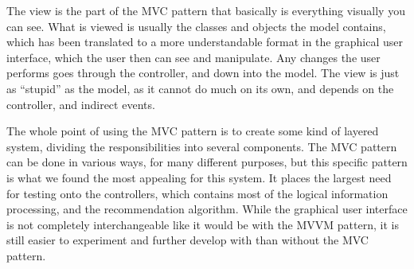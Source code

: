 The view is the part of the MVC pattern that basically is everything visually you can see. What is viewed is usually the classes and objects the model contains, which has been translated to a more understandable format in the graphical user interface, which the user then can see and manipulate. Any changes the user performs goes through the controller, and down into the model. The view is just as “stupid” as the model, as it cannot do much on its own, and depends on the controller, and indirect events.

The whole point of using the MVC pattern is to create some kind of layered system, dividing the responsibilities into several components. The MVC pattern can be done in various ways, for many different purposes, but this specific pattern is what we found the most appealing for this system. It places the largest need for testing onto the controllers, which contains most of the logical information processing, and the recommendation algorithm. While the graphical user interface is not completely interchangeable like it would be with the MVVM pattern, it is still easier to experiment and further develop with than without the MVC pattern.